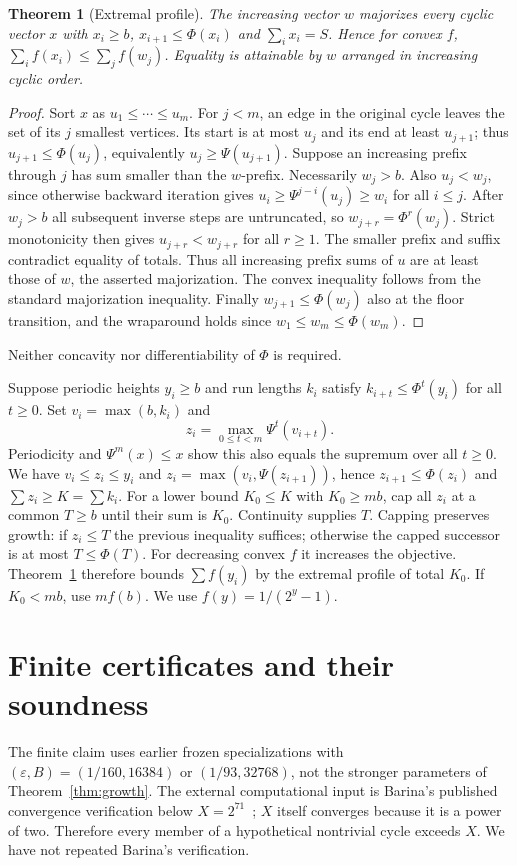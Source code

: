 \documentclass[11pt]{article}
\newtheorem{theorem}{Theorem}
\theoremstyle{definition}\newtheorem{definition}[theorem]{Definition}
\newcommand{\eps}{\varepsilon}
\begin{document}
\begin{theorem}[Extremal profile]\label{thm:profile}
The increasing vector $w$ majorizes every cyclic vector $x$ with $x_i\ge b$, $x_{i+1}\le\Phi(x_i)$ and $\sum_i x_i=S$. Hence for convex $f$, $\sum_i f(x_i)\le\sum_j f(w_j)$. Equality is attainable by $w$ arranged in increasing cyclic order.
\end{theorem}
\begin{proof}
Sort $x$ as $u_1\le\cdots\le u_m$. For $j<m$, an edge in the original cycle leaves the set of its $j$ smallest vertices. Its start is at most $u_j$ and its end at least $u_{j+1}$; thus $u_{j+1}\le\Phi(u_j)$, equivalently $u_j\ge\Psi(u_{j+1})$.
Suppose an increasing prefix through $j$ has sum smaller than the $w$-prefix. Necessarily $w_j>b$. Also $u_j<w_j$, since otherwise backward iteration gives $u_i\ge\Psi^{j-i}(u_j)\ge w_i$ for all $i\le j$. After $w_j>b$ all subsequent inverse steps are untruncated, so $w_{j+r}=\Phi^r(w_j)$. Strict monotonicity then gives $u_{j+r}<w_{j+r}$ for all $r\ge1$. The smaller prefix and suffix contradict equality of totals. Thus all increasing prefix sums of $u$ are at least those of $w$, the asserted majorization. The convex inequality follows from the standard majorization inequality. Finally $w_{j+1}\le\Phi(w_j)$ also at the floor transition, and the wraparound holds since $w_1\le w_m\le\Phi(w_m)$.
\end{proof}
Neither concavity nor differentiability of $\Phi$ is required.

Suppose periodic heights $y_i\ge b$ and run lengths $k_i$ satisfy $k_{i+t}\le\Phi^t(y_i)$ for all $t\ge0$. Set $v_i=\max(b,k_i)$ and
\[
 z_i=\max_{0\le t<m}\Psi^t(v_{i+t}).
\]
Periodicity and $\Psi^m(x)\le x$ show this also equals the supremum over all $t\ge0$. We have $v_i\le z_i\le y_i$ and $z_i=\max(v_i,\Psi(z_{i+1}))$, hence $z_{i+1}\le\Phi(z_i)$ and $\sum z_i\ge K=\sum k_i$.
For a lower bound $K_0\le K$ with $K_0\ge mb$, cap all $z_i$ at a common $T\ge b$ until their sum is $K_0$. Continuity supplies $T$. Capping preserves growth: if $z_i\le T$ the previous inequality suffices; otherwise the capped successor is at most $T\le\Phi(T)$. For decreasing convex $f$ it increases the objective. Theorem~\ref{thm:profile} therefore bounds $\sum f(y_i)$ by the extremal profile of total $K_0$. If $K_0<mb$, use $mf(b)$. We use $f(y)=1/(2^y-1)$.

\section{Finite certificates and their soundness}\label{sec:finite}
The finite claim uses earlier frozen specializations with $(\eps,B)=(1/160,16384)$ or $(1/93,32768)$, not the stronger parameters of Theorem~\ref{thm:growth}. The external computational input is Barina's published convergence verification below $X=2^{71}$~\cite{barina}; $X$ itself converges because it is a power of two. Therefore every member of a hypothetical nontrivial cycle exceeds $X$. We have not repeated Barina's verification.
\end{document}
